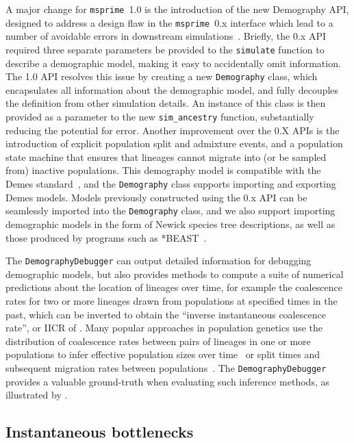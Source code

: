 \documentclass{article}
\newcommand{\msprime}[0]{\texttt{msprime}}
\begin{document}
A major change for \msprime\ 1.0 is the introduction of the new Demography API,
designed to address a design flaw in the \msprime\ 0.x interface which lead to
a number of avoidable errors in downstream
simulations~\citep{ragsdale2020lessons}. Briefly, the 0.x API required three
separate parameters be provided to the \texttt{simulate} function to describe a
demographic model, making it easy to accidentally omit information. The 1.0 API
resolves this issue by creating a new \texttt{Demography} class, which
encapsulates all information about the demographic model, and fully decouples
the definition from other simulation details. An instance of this class is then
provided as a parameter to the new \texttt{sim\_ancestry} function,
substantially reducing the potential for error.
Another improvement over the
0.X APIs is the introduction of explicit population split and admixture events,
and a population state machine that ensures that lineages cannot migrate into
(or be sampled from) inactive populations. This demography model is compatible
with the Demes standard~\citep{gower2021demes}, and the \texttt{Demography}
class supports importing and exporting Demes models.
Models previously constructed using the 0.x API can be seamlessly imported into
the \texttt{Demography} class, and we also support importing demographic
models in the form of Newick species tree descriptions, as well as those
produced by programs such as *BEAST~\citep{heled2009bayesian}.

The \texttt{DemographyDebugger} can output detailed information for debugging
demographic models, but also provides
methods to compute a suite of numerical predictions about the location of
lineages over time, for example the coalescence rates for two or more lineages
drawn from populations at specified times in the past,
which can be inverted to obtain the ``inverse instantaneous coalescence rate'',
or IICR of \citet{chikhi2018iicr}.
Many popular approaches in population genetics use the distribution of
coalescence rates between pairs of lineages in one or more populations to infer
effective population sizes over
time~\citep{li2011inference,sheehan2013estimating,schiffels2014inferring} or
split times and subsequent migration rates between
populations~\citep{wang2020tracking}.
The \texttt{DemographyDebugger} provides a valuable
ground-truth when evaluating such inference methods, as illustrated by
\cite{adrion2020community}.

\subsection*{Instantaneous bottlenecks}
\end{document}
